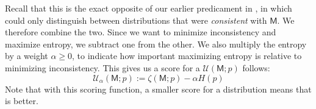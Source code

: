 \documentclass{article}
\newcommand{\sfM}{\mathsf M}
\numberwithin{equation}{section}
\begin{document}
    
	Recall that this is the exact opposite of our earlier
        predicament in , in which could
        only distinguish between distributions that were
        \emph{consistent} with $\sfM$. We therefore combine the
        two. Since we want to minimize inconsistency and maximize
        entropy, we subtract one from the other.  We also multiply the
        entropy by a weight $\alpha \ge 0$, to indicate how important
        maximizing entropy is relative to minimizing inconsistency.
        This gives us a score for a $\mathcal U(\sfM; p)$ 
        follows: 
	\begin{equation}
		\mathcal U_\alpha(\sfM; p) := \zeta(\sfM;p) - \alpha H(p) \label{eq:freeenergy-weighted}
	\end{equation}
Note that with this scoring function, a smaller score for a
distribution means that is better.
\end{document}
